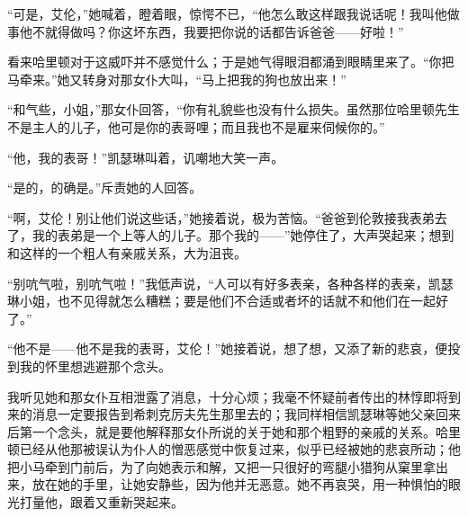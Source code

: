 \par “可是，艾伦，”她喊着，瞪着眼，惊愕不已，“他怎么敢这样跟我说话呢！我叫他做事他不就得做吗？你这坏东西，我要把你说的话都告诉爸爸——好啦！”
\par 看来哈里顿对于这威吓并不感觉什么；于是她气得眼泪都涌到眼睛里来了。“你把马牵来。”她又转身对那女仆大叫，“马上把我的狗也放出来！”
\par “和气些，小姐，”那女仆回答，“你有礼貌些也没有什么损失。虽然那位哈里顿先生不是主人的儿子，他可是你的表哥哩；而且我也不是雇来伺候你的。”
\par “他，我的表哥！”凯瑟琳叫着，讥嘲地大笑一声。
\par “是的，的确是。”斥责她的人回答。
\par “啊，艾伦！别让他们说这些话，”她接着说，极为苦恼。“爸爸到伦敦接我表弟去了，我的表弟是一个上等人的儿子。那个我的——”她停住了，大声哭起来；想到和这样的一个粗人有亲戚关系，大为沮丧。
\par “别吭气啦，别吭气啦！”我低声说，“人可以有好多表亲，各种各样的表亲，凯瑟琳小姐，也不见得就怎么糟糕；要是他们不合适或者坏的话就不和他们在一起好了。”
\par “他不是——他不是我的表哥，艾伦！”她接着说，想了想，又添了新的悲哀，便投到我的怀里想逃避那个念头。
\par 我听见她和那女仆互相泄露了消息，十分心烦；我毫不怀疑前者传出的林惇即将到来的消息一定要报告到希刺克厉夫先生那里去的；我同样相信凯瑟琳等她父亲回来后第一个念头，就是要他解释那女仆所说的关于她和那个粗野的亲戚的关系。哈里顿已经从他那被误认为仆人的憎恶感觉中恢复过来，似乎已经被她的悲哀所动；他把小马牵到门前后，为了向她表示和解，又把一只很好的弯腿小猎狗从窠里拿出来，放在她的手里，让她安静些，因为他并无恶意。她不再哀哭，用一种惧怕的眼光打量他，跟着又重新哭起来。
